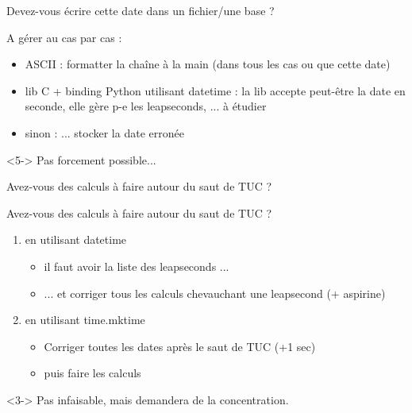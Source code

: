 \documentclass[]{beamer}
\begin{document}
\begin{frame}[fragile]{Devez-vous écrire cette date dans un fichier/une base ?}
    \begin{center}
        A gérer au cas par cas :
        \begin{itemize}
            \item<2-> ASCII : formatter la chaîne à la main (dans tous les cas ou
                que cette date)
            \item<3-> lib C + binding Python utilisant datetime : la lib accepte
                peut-être la date en seconde, elle gère p-e les leapseconds, ...
                à étudier
            \item<4-> sinon : ... stocker la date erronée
        \end{itemize}
    \end{center}
    \begin{block}<5->{}
        Pas forcement possible...
    \end{block}
\end{frame}

\begin{frame}[fragile]{Avez-vous des calculs à faire autour du saut de TUC ?}
\end{frame}

\begin{frame}[fragile]{Avez-vous des calculs à faire autour du saut de TUC ?}
    \begin{enumerate}
        \item en utilisant datetime
            \begin{itemize}
                \item il faut avoir la liste des leapseconds ...
                \item ... et corriger tous les calculs chevauchant une
                    leapsecond (+ aspirine)
            \end{itemize}
        \item<2-> en utilisant time.mktime
            \begin{itemize}
                \item Corriger toutes les dates après le saut de TUC (+1 sec)
                \item puis faire les calculs
            \end{itemize}
    \end{enumerate}
    \begin{block}<3->{}
        Pas infaisable, mais demandera de la concentration.
    \end{block}
\end{frame}
\end{document}
